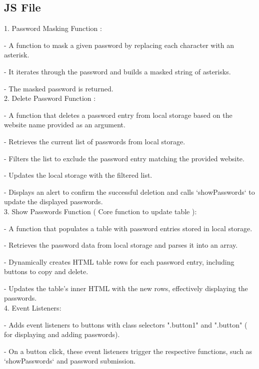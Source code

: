 \documentclass{article}
\begin{document}
\begin{itemsize}
\subsection{JS File}

1. Password Masking Function :
  \item   - A function to mask a given password by replacing each character with an asterisk.
  \item   - It iterates through the password and builds a masked string of asterisks.
   \item  - The masked password is returned.\\ 
   
2. Delete Password Function :

   \item  - A function that deletes a password entry from local storage based on the website name provided as an argument.
   \item  - Retrieves the current list of passwords from local storage.
   \item  - Filters the list to exclude the password entry matching the provided website.
    \item - Updates the local storage with the filtered list.
    \item - Displays an alert to confirm the successful deletion and calls `showPasswords` to update the displayed passwords.\\
    


3. Show Passwords Function ( Core function to update table ):
   \item  - A function that populates a table with password entries stored in local storage.
    \item - Retrieves the password data from local storage and parses it into an array.
    \item - Dynamically creates HTML table rows for each password entry, including buttons to copy and delete.
    \item - Updates the table's inner HTML with the new rows, effectively displaying the passwords.\\
    

4. Event Listeners:
    \item - Adds event listeners to buttons with class selectors ".button1" and ".button" ( for displaying and adding passwords).
    \item - On a button click, these event listeners trigger the respective functions, such as `showPasswords` and password submission.\\
    

\end{itemsize}
\end{document}
